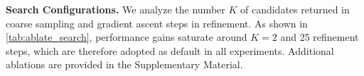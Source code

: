 \noindent\textbf{Search Configurations.} We analyze the number $K$ of candidates returned in coarse sampling and gradient ascent steps in refinement. As shown in \cref{tab:ablate_search}, performance gains saturate around $K=2$ and 25 refinement steps, which are therefore adopted as default in all experiments. Additional ablations are provided in the Supplementary Material.




